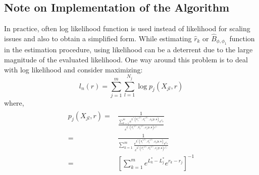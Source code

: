 \documentclass[11pt]{article}
\theoremstyle{remboldstyle}
\newcommand{\y}{{\boldsymbol{y}}}
\newcommand{\de}{{\boldsymbol{\delta}}}
\begin{document}
\subsection{Note on Implementation of the Algorithm}
In practice, often log likelihood function is used instead of likelihood for scaling issues and also to obtain a simplified form. While estimating $\hat{r}_k$ or $\hat{B}_{\phi, \phi_1}$ function in the estimation procedure, using likelihood can be a deterrent due to the large magnitude of the evaluated likelihood. One way around this problem is to deal with log likelihood and consider maximizing:
\begin{equation}
l_n(r) = \sum\limits_{j = 1}^m\sum\limits_{l = 1}^{N_j} \log p_j(X_{jl},r)
\end{equation}
where,
\begin{align}
\begin{split}
p_j(X_{jl},r) = {} & \frac{1}{\frac{\sum\limits_{k=1}^{m} e^{L^{*}(\theta_1^{(jl)}, \theta_2^{(jl)}, \phi_k| \y, \de)}e^{r_k}}  {e^{L^{*}(\theta_1^{(jl)}, \theta_2^{(jl)}, \phi_j| \y, \de)e^{r_j}}}}\\
= & \frac{1}{\sum\limits_{k=1}^{m} \frac{ e^{L^{*}(\theta_1^{(jl)}, \theta_2^{(jl)}, \phi_k| \y, \de)}e^{r_k}}  {e^{L^{*}(\theta_1^{(jl)}, \theta_2^{(jl)}, \phi_j| \y, \de)e^{r_j}}}}\\
= & [\sum\limits_{k=1}^{m} e^{L^*_k - L^*_j} e^{r_k - r_j}]^{-1}
\end{split}
\end{align}

\cite{romeo:tanaka:2006}



\end{document}
